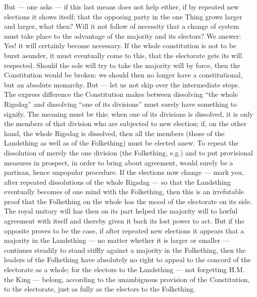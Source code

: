\documentclass[12pt,a4paper,openany]{book}
\newcommand{\opage}[1]{\marginnote{\footnotesize\textit{[#1]}}}
\begin{document}
But --- one asks --- if this last means
does not help either, if by repeated new elections
it shows itself; that the opposing party in the one Thing
grows larger and larger, what then? Will it not follow of necessity
that a change of system must take place
to the advantage of the majority and its
electors? We answer: Yes! it will certainly become necessary.
If the whole constitution is not to be burst asunder,
it must eventually come to this, that the electorate gets
its will respected. Should the sole will try to
take the majority will by force, then the Constitution would be
broken: we should then no longer have a constitutional, but
an absolute monarchy. But --- let us not skip over
the intermediate steps. The express difference the Constitution
makes between dissolving ``the whole Rigsdag'' and
dissolving ``one of its divisions'' must surely have
something to signify. The meaning must be this: when
one of its divisions is dissolved, it is only the members
of that division who are subjected to new election;
if, on the other hand, the whole Rigsdag is dissolved, then all the members
(those of the Landsthing as well as of the Folkething)
must be elected anew. To repeat the dissolution of merely the
one division (the Folkething, e.g.) and to put provisional
\setcounter{footnote}{0}%
\opage{15}measures in prospect, in order to bring about agreement,
would surely be a partisan, hence unpopular procedure.
If the elections now change --- mark you,
after repeated dissolutions of the whole Rigsdag --- so
that the Landsthing eventually becomes of one mind with the Folkething,
then this is an irrefutable proof that
the Folkething on the whole has the mood of the electorate
on its side. The royal unitary will has then on its
part helped the majority will to lawful agreement with
itself and thereby given it back its lost power to act.
But if the opposite proves to be the case,
if after repeated new elections it appears that a
majority in the Landsthing --- no matter whether it is larger
or smaller --- continues steadily to stand stiffly against
a majority in the Folkething, then the leaders of the Folkething have
absolutely no right to appeal to the concord of
the electorate as a whole; for the electors to the Landsthing
--- not forgetting H.M. the King --- belong, according to
the unambiguous provision of the Constitution, to the electorate,
just as fully as the electors to the Folkething.
\end{document}
